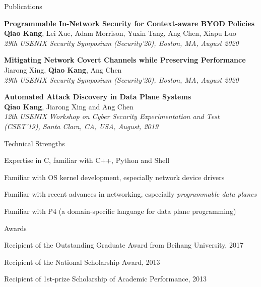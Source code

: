 \documentclass{resume} %
\begin{document}
\begin{rSection}{Publications}

\item {\bf Programmable In-Network Security for Context-aware BYOD Policies}\\
{\bf Qiao Kang}, Lei Xue, Adam Morrison, Yuxin Tang, Ang Chen, Xiapu Luo\\
{\em 29th USENIX Security Symposium (Security'20), Boston, MA, August 2020}

\item {\bf Mitigating Network Covert Channels while Preserving Performance}\\
Jiarong Xing, {\bf Qiao Kang}, Ang Chen\\
{\em 29th USENIX Security Symposium (Security'20), Boston, MA, August 2020}

\item {\bf Automated Attack Discovery in Data Plane Systems}\\
{\bf Qiao Kang}, Jiarong Xing and Ang Chen\\
{\em 12th USENIX Workshop on Cyber Security Experimentation and Test (CSET'19), Santa Clara, CA, USA, August, 2019}

\end{rSection}


\begin{rSection}{Technical Strengths} \itemsep -3pt

\item Expertise in C, familiar with C++, Python and Shell
\item Familiar with OS kernel development, especially network device drivers
\item Familiar with recent advances in networking, especially {\em programmable data planes}
\item Familiar with P4 (a domain-specific language for data plane programming)

\end{rSection}


\begin{rSection}{Awards} \itemsep -3pt
\item Recipient of the Outstanding Graduate Award from Beihang University, 2017
\item Recipient of the National Scholarship Award, 2013
\item Recipient of 1st-prize Scholarship of Academic Performance, 2013

\end{rSection}
\end{document}
